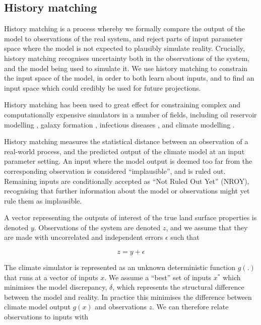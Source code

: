 \documentclass[gmd, manuscript]{copernicus}
\begin{document}
\subsection{History matching}\label{ssec:history_matching}

History matching is a process whereby we formally compare the output of the model to observations of the real system, and reject parts of input parameter space where the model is not expected to plausibly simulate reality. Crucially, history matching recognises uncertainty both in the observations of the system, and the model being used to simulate it. We use history matching to constrain the input space of the model, in order to both learn about inputs, and to find an input space which could credibly be used for future projections.

History matching has been used to great effect for constraining complex and computationally expensive simulators in a number of fields, including oil reservoir modelling \citep{craig1996strategies, craig1997pressure}, galaxy formation \citep{vernon2010galaxy, vernon2014observable}, infectious diseases \citep{andrianakis2015bayesian}, and climate modelling \citep{williamson2013history, williamson2015identifying, mcneall2020correcting}.

History matching measures the statistical distance between an observation of a real-world process, and the predicted output of the climate model at an input parameter setting. An input where the model output is deemed too far from the corresponding observation is considered ``implausible'', and is ruled out. Remaining inputs are conditionally accepted as ``Not Ruled Out Yet'' (NROY), recognising that further information about the model or observations might yet rule them as implausible.

A vector representing the outputs of interest of the true land surface properties is denoted $y$. Observations of the system are denoted $z$, and we assume that they are made with uncorrelated and independent errors $\epsilon$ such that 

\begin{equation}
z = y+\epsilon
\end{equation}

The climate simulator is represented as an unknown deterministic function $g(.)$ that runs at a vector of inputs $x$. We assume a ``best'' set of inputs $x^*$ which minimises the model discrepancy, $\delta$, which represents the structural difference between the model and reality. In practice this minimises the difference between climate model output $g(x)$ and observations $z$. We can therefore relate observations to inputs with 
\end{document}
